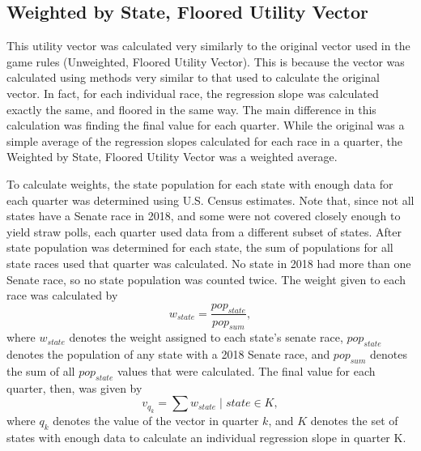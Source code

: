 \documentclass[11pt]{article}
\begin{document}
\newpage
\subsection{Weighted by State, Floored Utility Vector}
This utility vector was calculated very similarly to the original vector used in the game rules (Unweighted, Floored Utility Vector). This is because the vector was calculated using methods very similar to that used to calculate the original vector. In fact, for each individual race, the regression slope was calculated exactly the same, and floored in the same way. The main difference in this calculation was finding the final value for each quarter. While the original was a simple average of the regression slopes calculated for each race in a quarter, the Weighted by State, Floored Utility Vector was a weighted average.

To calculate weights, the state population for each state with enough data for each quarter was determined using U.S. Census estimates. Note that, since not all states have a Senate race in 2018, and some were not covered closely enough to yield straw polls, each quarter used data from a different subset of states. After state population was determined for each state, the sum of populations for all state races used that quarter was calculated. No state in 2018 had more than one Senate race, so no state population was counted twice. The weight given to each race was calculated by 
\begin{equation}
w_{state} = \frac{pop_{state}}{pop_{sum}},
\end{equation}
where $w_{state}$ denotes the weight assigned to each state's senate race, $pop_{state}$ denotes the population of any state with a 2018 Senate race, and $pop_{sum}$ denotes the sum of all $pop_{state}$ values that were calculated. The final value for each quarter, then, was given by 
\begin{equation}
v_{q_k} = \sum w_{state} \mid state \in K,
\end{equation}
where $q_k$ denotes the value of the vector in quarter $k$, and $K$ denotes the set of states with enough data to calculate an individual regression slope in quarter K. 
\end{document}
